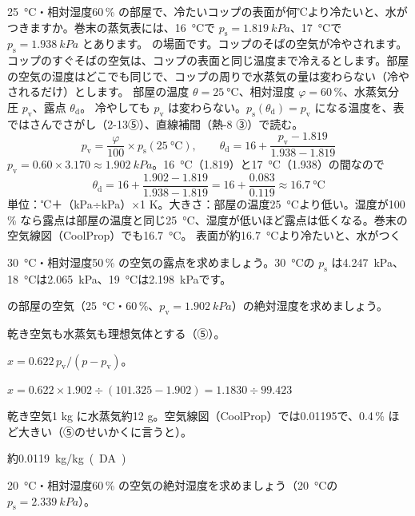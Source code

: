 \begin{phreidai}[冷たいコップに水がつく温度（露点）]
\label{ph:熱-9:ex1}\qty{25}{\celsius}・相対湿度60\,\% の部屋で、冷たいコップの表面が何℃より冷たいと、水がつきますか。巻末の蒸気表には、\qty{16}{\celsius}で $p_{\mathrm s}=\qty{1.819}{kPa}$、\qty{17}{\celsius}で $p_{\mathrm s}=\qty{1.938}{kPa}$ とあります。
\phbamen
\bkhatenaref の場面です。コップのそばの空気が冷やされます。
\phmushi
コップのすぐそばの空気は、コップの表面と同じ温度まで冷えるとします。部屋の空気の湿度はどこでも同じで、コップの周りで水蒸気の量は変わらない（冷やされるだけ）とします。
\phzu
部屋の温度 $\theta=\qty{25}{\celsius}$、相対湿度 $\varphi=60\,\%$、水蒸気分圧 $p_{\mathrm v}$、露点 $\theta_{\mathrm d}$。
\phriyu
冷やしても $p_{\mathrm v}$ は変わらない。$p_{\mathrm s}(\theta_{\mathrm d})=p_{\mathrm v}$ になる温度を、表ではさんでさがし（2-13⑤）、直線補間（熱-8 ③）で読む。
\phtateru
\[ p_{\mathrm v}=\frac{\varphi}{100}\times p_{\mathrm s}(\qty{25}{\celsius}),\qquad \theta_{\mathrm d}=16+\frac{p_{\mathrm v}-1.819}{1.938-1.819} \]
\phtoku
$p_{\mathrm v}=0.60\times3.170\approx\qty{1.902}{kPa}$。\qty{16}{\celsius}（1.819）と\qty{17}{\celsius}（1.938）の間なので
\[ \theta_{\mathrm d}=16+\frac{1.902-1.819}{1.938-1.819}=16+\frac{0.083}{0.119}\approx\qty{16.7}{\celsius} \]
\phtashikame
単位：℃＋（kPa÷kPa）×1 K。大きさ：部屋の温度\qty{25}{\celsius}より低い。湿度が100\,\% なら露点は部屋の温度と同じ\qty{25}{\celsius}、湿度が低いほど露点は低くなる。巻末の空気線図（CoolProp）でも\qty{16.7}{\celsius}。
\kotae 表面が約\qty{16.7}{\celsius}より冷たいと、水がつく
\end{phreidai}
\begin{jibun}
\qty{30}{\celsius}・相対湿度50\,\% の空気の露点を求めましょう。\qty{30}{\celsius}の $p_{\mathrm s}$ は\qty{4.247}{kPa}、\qty{18}{\celsius}は\qty{2.065}{kPa}、\qty{19}{\celsius}は\qty{2.198}{kPa}です。
\end{jibun}

\begin{reidai}[絶対湿度を求める]
\label{ph:熱-9:ex2}の部屋の空気（\qty{25}{\celsius}・60\,\%、$p_{\mathrm v}=\qty{1.902}{kPa}$）の絶対湿度を求めましょう。
\par{} 乾き空気も水蒸気も理想気体とする（⑤）。
\par\kangaekata $x=0.622\,p_{\mathrm v}/(p-p_{\mathrm v})$。
\par\shiki $x=0.622\times1.902\div(101.325-1.902)=1.1830\div99.423$
\par{} 乾き空気1 kg に水蒸気約12 g。空気線図（CoolProp）では0.01195で、0.4\,\% ほど大きい（⑤のせいかくに言うと）。
\par\kotae 約\qty{0.0119}{kg/kg(DA)}
\end{reidai}
\begin{jibun}
\qty{20}{\celsius}・相対湿度60\,\% の空気の絶対湿度を求めましょう（\qty{20}{\celsius}の $p_{\mathrm s}=\qty{2.339}{kPa}$）。
\end{jibun}

